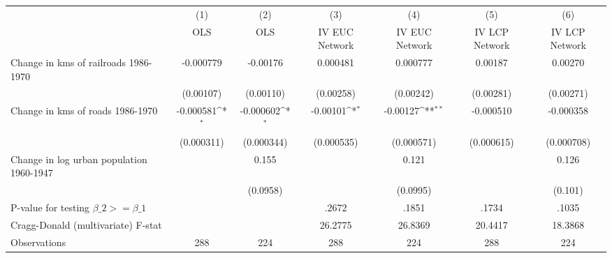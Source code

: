 {
\def\sym#1{\ifmmode^{#1}\else\(^{#1}\)\fi}
\begin{tabular}{l*{6}{c}}
\hline\hline
                &\multicolumn{1}{c}{(1)}&\multicolumn{1}{c}{(2)}&\multicolumn{1}{c}{(3)}&\multicolumn{1}{c}{(4)}&\multicolumn{1}{c}{(5)}&\multicolumn{1}{c}{(6)}\\
                &\multicolumn{1}{c}{OLS}&\multicolumn{1}{c}{OLS}&\multicolumn{1}{c}{IV EUC Network}&\multicolumn{1}{c}{IV EUC Network}&\multicolumn{1}{c}{IV LCP Network}&\multicolumn{1}{c}{IV LCP Network}\\
\hline
Change in kms of railroads 1986-1970&-0.000779         & -0.00176         & 0.000481         & 0.000777         &  0.00187         &  0.00270         \\
                &(0.00107)         &(0.00110)         &(0.00258)         &(0.00242)         &(0.00281)         &(0.00271)         \\
[1em]
Change in kms of roads 1986-1970&-0.000581\sym{*}  &-0.000602\sym{*}  & -0.00101\sym{*}  & -0.00127\sym{**} &-0.000510         &-0.000358         \\
                &(0.000311)         &(0.000344)         &(0.000535)         &(0.000571)         &(0.000615)         &(0.000708)         \\
[1em]
Change in log urban population 1960-1947&                  &    0.155         &                  &    0.121         &                  &    0.126         \\
                &                  & (0.0958)         &                  & (0.0995)         &                  &  (0.101)         \\
\hline
P-value for testing $\beta\_{2} >= \beta\_{1}$&                  &                  &    .2672         &    .1851         &    .1734         &    .1035         \\
Cragg-Donald (multivariate) F-stat&                  &                  &  26.2775         &  26.8369         &  20.4417         &  18.3868         \\
Observations    &      288         &      224         &      288         &      224         &      288         &      224         \\
\hline\hline
\end{tabular}
}
